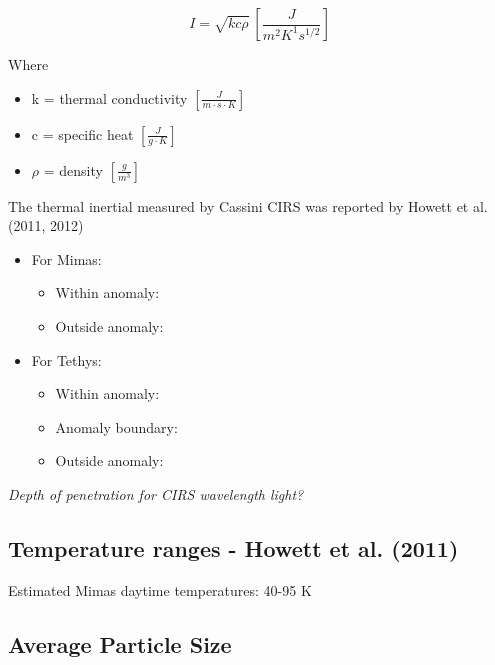 \documentclass[11pt]{article} %
\begin{document}
	\begin{equation}
	I = \sqrt{kc\rho} \: [\frac{J}{m^{2} K^{1} s^{1/2}}]
	\end{equation}

	\hspace{1cm}
	Where
	\begin{itemize}[leftmargin=3cm]
	\item k = thermal conductivity $[\frac{J}{m \cdot s \cdot K}]$
	\item c = specific heat $[\frac{J}{g \cdot K}]$
	\item $\rho$ = density $[\frac{g}{m^{3}}]$
	\end{itemize}

	The thermal inertial measured by Cassini CIRS was reported by Howett et al. (2011, 2012)
	\begin{itemize}
		\item For Mimas:
		\begin{itemize}
			\item Within anomaly: 
			\item Outside anomaly: 
		\end{itemize}
		\item For Tethys:
		\begin{itemize}
			\item Within anomaly: 
			\item Anomaly boundary: 
			\item Outside anomaly: 
		\end{itemize}
	\end{itemize}
		
	\emph{Depth of penetration for CIRS wavelength light?}
	
\subsection{Temperature ranges - Howett et al. (2011)}
\label{sec:temperature}

	Estimated Mimas daytime temperatures: 40-95 K
	
\subsection{Average Particle Size}
\label{sec:size}

	
\end{document}
